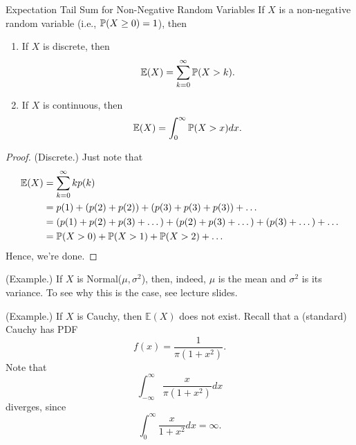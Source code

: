 \documentclass[letterpaper]{article}
\begin{document}
\begin{theorem}{Expectation Tail Sum for Non-Negative Random Variables}{}
    If $X$ is a non-negative random variable (i.e., $\mathbb{P}(X \geq 0) = 1$), then 
    \begin{enumerate}
        \item If $X$ is discrete, then 
        \[\mathbb{E}(X) = \sum_{k = 0}^{\infty} \mathbb{P}(X > k).\]

        \item If $X$ is continuous, then 
        \[\mathbb{E}(X) = \int_{0}^{\infty} \mathbb{P}(X > x) dx.\]
    \end{enumerate}
\end{theorem}

\begin{mdframed}[]
    \begin{proof}
        (Discrete.) Just note that 
        \begin{equation*}
            \begin{aligned}
                \mathbb{E}(X) &= \sum_{k = 0}^{\infty} kp(k) \\ 
                    &= p(1) + (p(2) + p(2)) + (p(3) + p(3) + p(3)) + \dots \\ 
                    &= (p(1) + p(2) + p(3) + \dots) + (p(2) + p(3) + \dots) + (p(3) + \dots) + \dots \\
                    &= \mathbb{P}(X > 0) + \mathbb{P}(X > 1) + \mathbb{P}(X > 2) + \dots
            \end{aligned}
        \end{equation*}
        Hence, we're done.
    \end{proof}
\end{mdframed}

\begin{mdframed}[]
    (Example.) If $X$ is Normal($\mu, \sigma^2$), then, indeed, $\mu$ is the mean and $\sigma^2$ is its variance. To see why this is the case, see lecture slides.
\end{mdframed}

\begin{mdframed}[]
    (Example.) If $X$ is Cauchy, then $\mathbb{E}(X)$ does not exist. Recall that a (standard) Cauchy has PDF 
    \[f(x) = \frac{1}{\pi(1 + x^2)}.\]
    Note that 
    \[\int_{-\infty}^{\infty} \frac{x}{\pi (1 + x^2)}dx\]
    diverges, since
    \[\int_{0}^{\infty} \frac{x}{1 + x^2}dx = \infty.\]
\end{mdframed}
\end{document}
